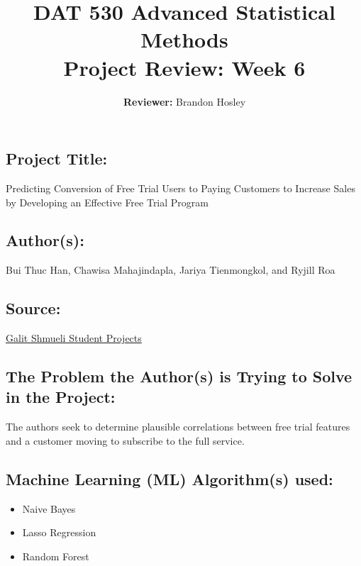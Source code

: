 \documentclass[]{article}
\title{\textbf{DAT 530 Advanced Statistical Methods}\\
	\normalsize{Project Review: Week 6} }
\author{\textbf{Reviewer: }
	Brandon Hosley}
\begin{document}
\setlength{\droptitle}{-10em} 
\pretitle{\begin{flushleft}\LARGE} %
	\posttitle{\end{flushleft}}
\preauthor{\begin{flushleft}\large} %
	\postauthor{\end{flushleft}}
\predate{\begin{flushleft}\large} %
	\postdate{\end{flushleft}}
\maketitle

\vspace{-2em}

\subsection*{Project Title:}
Predicting Conversion of Free Trial Users to Paying Customers
to Increase Sales by Developing an Effective Free Trial Program

\subsection*{Author(s):}
Bui Thuc Han,
Chawisa Mahajindapla,
Jariya Tienmongkol,
and Ryjill Roa

\subsection*{Source:}
\href{https://www.galitshmueli.com/data-mining-project/predicting-conversion-free-trial-users-paying-customers-increase-sales}{Galit Shmueli Student Projects}

\subsection*{The Problem the Author(s) is Trying to Solve in the Project:}
The authors seek to determine plausible correlations between free trial features and a customer moving to subscribe to the full service.

\subsection*{Machine Learning (ML) Algorithm(s) used:}
\begin{itemize}
	\item Naive Bayes
	\item Lasso Regression
	\item Random Forest
\end{itemize}
\end{document}
